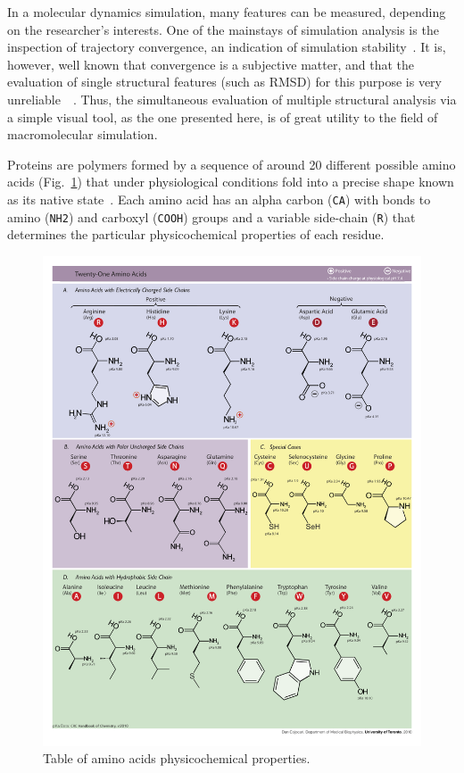 \documentclass[10pt, conference]{IEEEtran}
\begin{document}
In a molecular dynamics simulation, many features can be measured, depending on the researcher’s interests. One of the mainstays of simulation analysis is the inspection of trajectory convergence, an indication of simulation stability~\cite{grossfield2007convergence}. It is, however, well known that convergence is a subjective matter, and that the evaluation of single structural features (such as RMSD) for this purpose is very unreliable~\cite{knapp2011intuitive}~\cite{van2006biomolecular}. Thus, the simultaneous evaluation of multiple structural analysis via a simple visual tool, as the one presented here, is of great utility to the field of macromolecular simulation.

Proteins are polymers formed by a sequence of around 20 different possible amino acids (Fig.~\ref{fig:aminoacids}) that under physiological conditions fold into a precise shape known as its native state~\cite{anfinsen:1973}. Each amino acid has an alpha carbon (\texttt{CA}) with bonds to amino (\texttt{NH2}) and carboxyl (\texttt{COOH}) groups and a variable side-chain (\texttt{R}) that determines the particular physicochemical properties of each residue. 

\begin{figure}
\includegraphics[width=0.8\linewidth]{figs/Amino_Acids.png}
\caption{Table of amino acids physicochemical properties.} 
\label{fig:aminoacids}
\end{figure}
\end{document}
